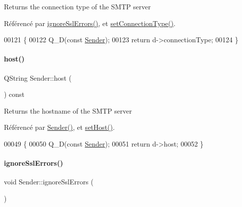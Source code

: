 Returns the connection type of the S\+M\+TP server 

Référencé par \hyperlink{class_simple_mail_1_1_sender_a198c2a1fef662cd2323d05c1f5fa6adb}{ignore\+Ssl\+Errors()}, et \hyperlink{class_simple_mail_1_1_sender_a879bee44b1e7afed564c82b81261a9b1}{set\+Connection\+Type()}.


\begin{DoxyCode}
00121 \{
00122     Q\_D(\textcolor{keyword}{const} \hyperlink{class_simple_mail_1_1_sender}{Sender});
00123     \textcolor{keywordflow}{return} d->connectionType;
00124 \}
\end{DoxyCode}
\mbox{\label{class_simple_mail_1_1_sender_a688b0cf38532aa73fa943fa4a8d9f797}} 
\paragraph{\texorpdfstring{host()}{host()}}
{\footnotesize\ttfamily Q\+String Sender\+::host (\begin{DoxyParamCaption}{ }\end{DoxyParamCaption}) const}

Returns the hostname of the S\+M\+TP server 

Référencé par \hyperlink{class_simple_mail_1_1_sender_a120ee6620d9f22b5c008b27743d03a6d}{Sender()}, et \hyperlink{class_simple_mail_1_1_sender_a18c47159817fafe9dd3f75855028f70a}{set\+Host()}.


\begin{DoxyCode}
00049 \{
00050     Q\_D(\textcolor{keyword}{const} \hyperlink{class_simple_mail_1_1_sender}{Sender});
00051     \textcolor{keywordflow}{return} d->host;
00052 \}
\end{DoxyCode}
\mbox{\label{class_simple_mail_1_1_sender_a198c2a1fef662cd2323d05c1f5fa6adb}} 
\paragraph{\texorpdfstring{ignore\+Ssl\+Errors()}{ignoreSslErrors()}\hspace{0.1cm}{\footnotesize\ttfamily [1/2]}}
{\footnotesize\ttfamily void Sender\+::ignore\+Ssl\+Errors (\begin{DoxyParamCaption}{ }\end{DoxyParamCaption})}




